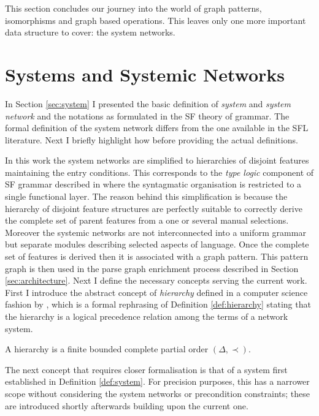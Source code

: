     This section concludes our journey into the world of graph patterns, isomorphisms and graph based operations. This leaves only one more important data structure to cover: the system networks. 

\section{Systems and Systemic Networks}
\label{sec:system-networks-cs}
    In Section \ref{sec:system} I presented the basic definition of \textit{system} and \textit{system network} and the notations as formulated in the SF theory of grammar. The formal definition of the system network differs from the one available in the SFL literature. Next I briefly highlight how before providing the actual definitions. 
    
    In this work the system networks are simplified to hierarchies of disjoint features maintaining the entry conditions. This corresponds to the \textit{type logic} component of SF grammar described in \citet{ODonnell1993} where the syntagmatic organisation is restricted to a single functional layer. The reason behind this simplification is because the hierarchy of disjoint feature structures are perfectly suitable to correctly derive the complete set of parent features from a one or several manual selections. Moreover the systemic networks are not interconnected into a uniform grammar but separate modules describing selected aspects of language. Once the complete set of features is derived then it is associated with a graph pattern. This pattern graph is then used in the parse graph enrichment process described in Section \ref{sec:architecture}. Next I define the necessary concepts serving the current work.  
    First I introduce the abstract concept of \textit{hierarchy} defined in a computer science fashion by \citet[30]{Pollard1987},  which is a formal rephrasing of Definition \ref{def:hierarchy} stating that the hierarchy is a logical precedence relation among the terms of a network system. 

    \begin{definition}[Hierarchy]\label{def:hierarchy-cs}
    	A hierarchy is a finite bounded complete partial order $(\varDelta,\prec)$. 
    \end{definition}

    The next concept that requires closer formalisation is that of a system first established in Definition \ref{def:system}. For precision purposes, this has a narrower scope without considering the system networks or precondition constraints; these are introduced shortly afterwards building upon the current one.

